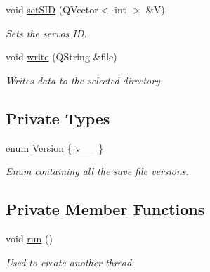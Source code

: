 \begin{DoxyCompactItemize}
void \hyperlink{class_servo_thread_ac3471e5020f5d9babd3f2ff7b3b82aca}{set\+S\+I\+D} (Q\+Vector$<$ int $>$ \&V)
\begin{DoxyCompactList}\small\item\em Sets the servos I\+D. \end{DoxyCompactList}\item 
void \hyperlink{class_servo_thread_ae5753b8c12768d2115ff900f0ab8e13c}{write} (Q\+String \&file)
\begin{DoxyCompactList}\small\item\em Writes data to the selected directory. \end{DoxyCompactList}\end{DoxyCompactItemize}
\subsection*{Private Types}
\begin{DoxyCompactItemize}
\item 
enum \hyperlink{class_servo_thread_aeccce0ac6a969e2ee7cbe91687e2d085}{Version} \{ \hyperlink{class_servo_thread_aeccce0ac6a969e2ee7cbe91687e2d085a319b6bf2cb120faeefbd0a5118ece7e3}{v\+\_\+\_}
 \}
\begin{DoxyCompactList}\small\item\em Enum containing all the save file versions. \end{DoxyCompactList}\end{DoxyCompactItemize}
\subsection*{Private Member Functions}
\begin{DoxyCompactItemize}
\item 
void \hyperlink{class_servo_thread_aeeb31b85abf7eb5c701853a6d25e51e0}{run} ()
\begin{DoxyCompactList}\small\item\em Used to create another thread. \end{DoxyCompactList}\end{DoxyCompactItemize}
